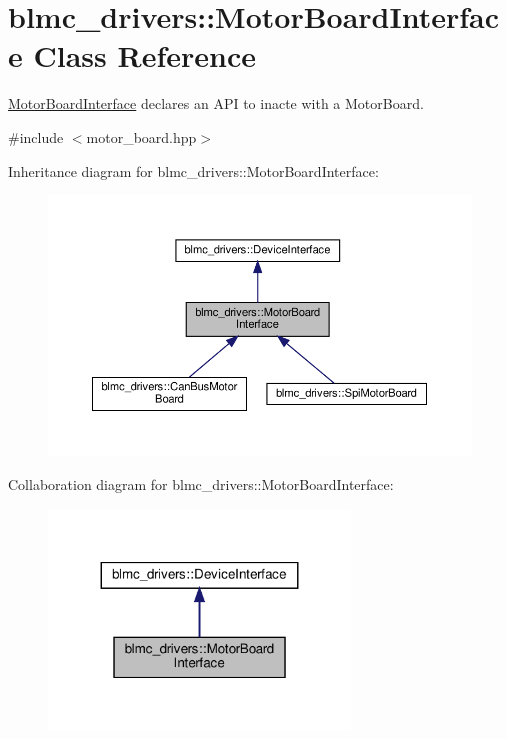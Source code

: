 \hypertarget{classblmc__drivers_1_1MotorBoardInterface}{}\section{blmc\+\_\+drivers\+:\+:Motor\+Board\+Interface Class Reference}
\label{classblmc__drivers_1_1MotorBoardInterface}


\hyperlink{classblmc__drivers_1_1MotorBoardInterface}{Motor\+Board\+Interface} declares an A\+PI to inacte with a Motor\+Board.  




{\ttfamily \#include $<$motor\+\_\+board.\+hpp$>$}



Inheritance diagram for blmc\+\_\+drivers\+:\+:Motor\+Board\+Interface\+:
\nopagebreak
\begin{figure}[H]
\begin{center}
\leavevmode
\includegraphics[width=350pt]{classblmc__drivers_1_1MotorBoardInterface__inherit__graph}
\end{center}
\end{figure}


Collaboration diagram for blmc\+\_\+drivers\+:\+:Motor\+Board\+Interface\+:
\nopagebreak
\begin{figure}[H]
\begin{center}
\leavevmode
\includegraphics[width=227pt]{classblmc__drivers_1_1MotorBoardInterface__coll__graph}
\end{center}
\end{figure}

